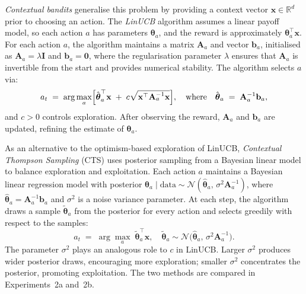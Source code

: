 \emph{Contextual bandits} generalise this problem by providing a context vector $\mathbf{x}\in\mathbb{R}^d$ prior to choosing an action. The \emph{LinUCB} algorithm assumes a linear payoff model, so each action $a$ has parameters $\boldsymbol{\theta}_a$, and the reward is approximately $\boldsymbol{\theta}_a^\top \mathbf{x}$. For each action $a$, the algorithm maintains a matrix $\mathbf{A}_a$ and vector $\mathbf{b}_a$, initialised as $\mathbf{A}_a = \lambda \mathbf{I}$ and $\mathbf{b}_a = \mathbf{0}$, where the regularisation parameter $\lambda$ ensures that $\mathbf{A}_a$ is invertible from the start and provides numerical stability. The algorithm selects $a$ via:
\begin{equation}
a_t
\;=\;
\arg\max_{a}\Bigl[\hat{\boldsymbol{\theta}}_{a}^\top \mathbf{x}
\;+\;
c\sqrt{\mathbf{x}^\top \mathbf{A}_a^{-1}\mathbf{x}}\Bigr],
\quad
\text{where}
\quad
\hat{\boldsymbol{\theta}}_{a} \;=\; \mathbf{A}_a^{-1}\mathbf{b}_a,
\end{equation}
and $c>0$ controls exploration. After observing the reward, $\mathbf{A}_a$ and $\mathbf{b}_a$ are updated, refining the estimate of $\boldsymbol{\theta}_a$.

As an alternative to the optimism-based exploration of LinUCB, \emph{Contextual Thompson Sampling} (CTS) uses posterior sampling from a Bayesian linear model to balance exploration and exploitation. Each action $a$ maintains a Bayesian linear regression model with posterior $\boldsymbol{\theta}_a \mid \text{data} \sim \mathcal{N}(\hat{\boldsymbol{\theta}}_a,\, \sigma^2 \mathbf{A}_a^{-1})$, where $\hat{\boldsymbol{\theta}}_a = \mathbf{A}_a^{-1}\mathbf{b}_a$ and $\sigma^2$ is a noise variance parameter. At each step, the algorithm draws a sample $\tilde{\boldsymbol{\theta}}_a$ from the posterior for every action and selects greedily with respect to the samples:
\begin{equation}
a_t \;=\; \arg\max_{a}\; \tilde{\boldsymbol{\theta}}_a^\top \mathbf{x}, \quad \tilde{\boldsymbol{\theta}}_a \sim \mathcal{N}\!\bigl(\hat{\boldsymbol{\theta}}_a,\, \sigma^2 \mathbf{A}_a^{-1}\bigr).
\end{equation}
The parameter $\sigma^2$ plays an analogous role to $c$ in LinUCB. Larger $\sigma^2$ produces wider posterior draws, encouraging more exploration; smaller $\sigma^2$ concentrates the posterior, promoting exploitation. The two methods are compared in Experiments~2a and~2b.

